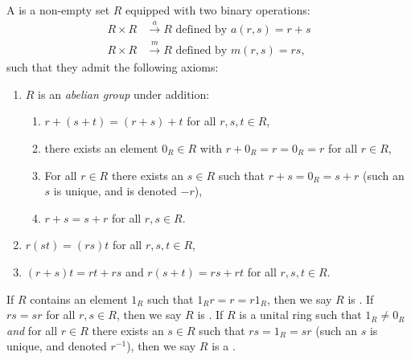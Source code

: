     \begin{definition}
        A  is a non-empty set $R$ equipped with two binary operations: 
            \begin{equation*}
            \begin{split}
                R \times R &\xrightarrow{a} R \hspace{4pt}\text{defined by}\hspace{4pt} a(r,s) = r+s\\
                R \times R &\xrightarrow{m} R \hspace{4pt}\text{defined by}\hspace{4pt} m(r,s) = rs,
            \end{split}
            \end{equation*}
        such that they admit the following axioms:
            \begin{enumerate}[label = (\arabic*)]
                \item $R$ is an \textit{abelian group} under addition:
                    \begin{enumerate}[label = (\roman*)]
                        \item $r+(s+t) = (r+s) + t$ for all $r,s,t \in R$,
                        \item there exists an element $0_R \in R$ with $r + 0_R = r = 0_R = r$ for all $r \in R$,
                        \item For all $r \in R$ there exists an $s \in R$ such that $r+s = 0_R = s + r$ (such an $s$ is unique, and is denoted $-r$),
                        \item $r+s = s+r$ for all $r,s \in R$.
                    \end{enumerate}
                \item $r(st) = (rs)t$ for all $r,s,t \in R$,
                \item $(r+s)t = rt + rs$ and $r(s + t)= rs + rt$ for all $r,s,t \in R$.
            \end{enumerate}
        If $R$ contains an element $1_R$ such that $1_R r = r = r 1_R$, then we say $R$ is . If $rs = sr$ for all $r,s \in R$, then we say $R$ is . If $R$ is a unital ring such that $1_R \neq 0_R$ \textit{and} for all $r \in R$ there exists an $s \in R$ such that $rs = 1_R = sr$ (such an $s$ is unique, and denoted $r^{-1}$), then we say $R$ is a .
    \end{definition}

